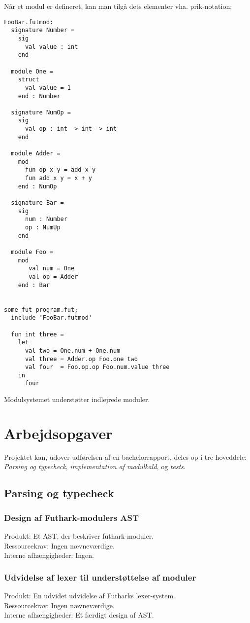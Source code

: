 \documentclass[12pt]{article}
\begin{document}
Når et modul er defineret, kan man tilgå dets elementer vha. prik-notation:
\begin{verbatim}
FooBar.futmod:
  signature Number =
    sig
      val value : int
    end

  module One =
    struct
      val value = 1
    end : Number

  signature NumOp =
    sig
      val op : int -> int -> int
    end

  module Adder =
    mod
      fun op x y = add x y
      fun add x y = x + y
    end : NumOp
  
  signature Bar =
    sig
      num : Number
      op : NumUp
    end

  module Foo =
    mod
       val num = One
       val op = Adder
    end : Bar


some_fut_program.fut;
  include 'FooBar.futmod'

  fun int three =
    let
      val two = One.num + One.num
      val three = Adder.op Foo.one two
      val four  = Foo.op.op Foo.num.value three
    in 
      four
\end{verbatim}

Modulsystemet understøtter indlejrede moduler.
\section{Arbejdsopgaver}
Projektet kan, udover udførelsen af en bachelorrapport, deles op i tre
hoveddele:\\
\textit{Parsing og typecheck}, \textit{implementation af modulkald}, og \textit{tests}.
\subsection{Parsing og typecheck}
\subsubsection{Design af Futhark-modulers AST}
Produkt: Et AST, der beskriver futhark-moduler.\\
Ressourcekrav: Ingen nævneværdige.\\
Interne afhængigheder: Ingen.
\subsubsection{Udvidelse af lexer til understøttelse af moduler}
Produkt: En udvidet udvidelse af Futharks lexer-system.\\
Ressourcekrav: Ingen nævneværdige.\\
Interne afhængigheder: Et færdigt design af AST.
\end{document}
